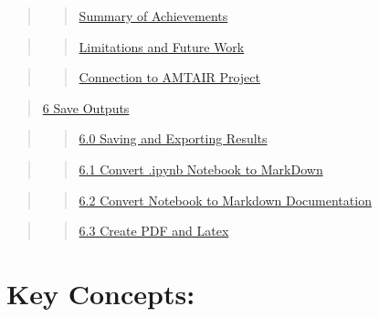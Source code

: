 \documentclass[
  11pt,
  letterpaper,
]{book}
\begin{document}
\begin{quote}
\begin{quote}
\hyperref[scrollTo=oatKYlKrOSiNux26uniqifier=1]{Summary of Achievements}
\end{quote}
\end{quote}

\begin{quote}
\begin{quote}
\hyperref[scrollTo=oatKYlKrOSiNux26uniqifier=1]{Limitations and Future
Work}
\end{quote}
\end{quote}

\begin{quote}
\begin{quote}
\hyperref[scrollTo=oatKYlKrOSiNux26uniqifier=1]{Connection to AMTAIR
Project}
\end{quote}
\end{quote}

\begin{quote}
\hyperref[scrollTo=kjbIj19epbrFux26uniqifier=1]{6 Save Outputs}
\end{quote}

\begin{quote}
\begin{quote}
\hyperref[scrollTo=0QqlN6dYpm4sux26uniqifier=1]{6.0 Saving and Exporting
Results}
\end{quote}
\end{quote}

\begin{quote}
\begin{quote}
\hyperref[scrollTo=pS6AhdiSCLw4ux26uniqifier=1]{6.1 Convert .ipynb
Notebook to MarkDown}
\end{quote}
\end{quote}

\begin{quote}
\begin{quote}
\hyperref[scrollTo=SUoQhT_U3AJbux26uniqifier=1]{6.2 Convert Notebook to
Markdown Documentation}
\end{quote}
\end{quote}

\begin{quote}
\begin{quote}
\hyperref[scrollTo=Tpk3z0Ta3ODsux26uniqifier=1]{6.3 Create PDF and
Latex}
\end{quote}
\end{quote}

\section{Key Concepts:}\label{key-concepts}
\end{document}
